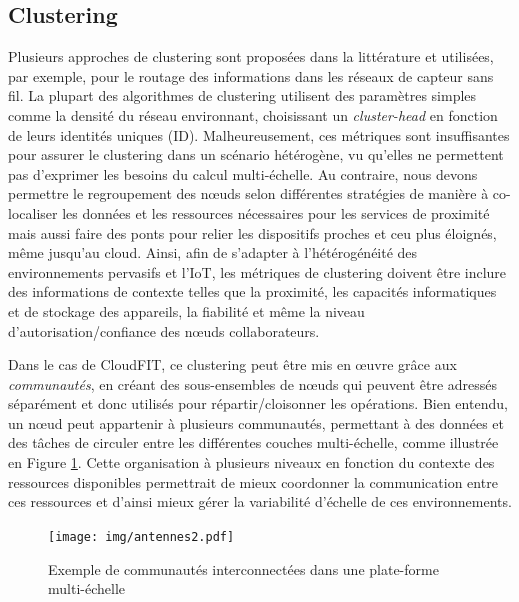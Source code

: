 \subsection{Clustering}

Plusieurs approches de clustering sont proposées dans la littérature \cite{Johnen2011} et utilisées, par exemple, pour  le routage des informations dans les réseaux de capteur sans fil. La plupart des algorithmes de clustering utilisent des paramètres simples comme la densité du réseau environnant, choisissant un \textit{cluster-head} en fonction de leurs identités uniques (ID). Malheureusement, ces métriques sont insuffisantes pour assurer le clustering dans un scénario hétérogène, vu qu'elles ne permettent pas d'exprimer les besoins du calcul multi-échelle. Au contraire, nous devons permettre le regroupement des n{\oe}uds selon différentes stratégies de manière à co-localiser les données et les ressources nécessaires pour les services de proximité mais aussi faire des ponts pour relier les dispositifs proches et ceu plus éloignés, même jusqu'au cloud. Ainsi, afin de s'adapter à l'hétérogénéité des environnements pervasifs et l'IoT, les métriques de clustering doivent être inclure des informations de contexte telles que la proximité, les capacités informatiques et de stockage des appareils, la fiabilité et même la niveau d'autorisation/confiance des n{\oe}uds collaborateurs.
 
Dans le cas de CloudFIT, ce clustering peut être mis en {\oe}uvre grâce aux \textit{communautés}, en créant des sous-ensembles de n{\oe}uds qui peuvent être adressés séparément et donc utilisés pour répartir/cloisonner les opérations. Bien entendu, un n{\oe}ud peut appartenir à plusieurs communautés, permettant à des données et des tâches de circuler entre les différentes couches multi-échelle, comme illustrée en Figure \ref{fig:antennes}. Cette organisation à plusieurs niveaux en fonction du contexte des ressources disponibles permettrait de mieux coordonner la communication entre ces ressources et d'ainsi mieux gérer la variabilité d'échelle de ces environnements. 

 
 \begin{figure}[!ht]
 	\centering
 	\texttt{[image: img/antennes2.pdf]}
 	\caption{Exemple de communautés interconnectées dans une plate-forme multi-échelle}
 	\label{fig:antennes}
 \end{figure}

